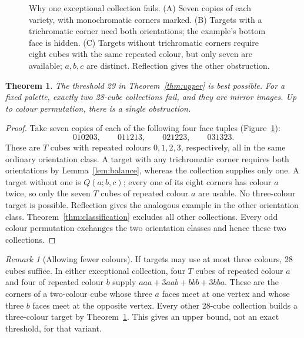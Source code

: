 \documentclass[11pt]{article}
\newtheorem{theorem}{Theorem}
\theoremstyle{remark}
\newtheorem*{remark}{Remark}
\begin{document}
\begin{figure}[ht]
\centering

\caption{Why one exceptional collection fails. (A) Seven copies of each
variety, with monochromatic corners marked. (B) Targets with a trichromatic
corner need both orientations; the example's bottom face is hidden. (C) Targets without
trichromatic corners require eight cubes with the same repeated colour,
but only seven are available; $a,b,c$ are distinct. Reflection gives the
other obstruction.}
\label{fig:obstruction}
\end{figure}
\begin{theorem}\label{thm:sharp}
The threshold 29 in Theorem~\ref{thm:upper} is best possible. For a fixed
palette, exactly two 28-cube collections fail, and they are mirror images.
Up to colour permutation, there is a single obstruction.
\end{theorem}
\begin{proof}
Take seven copies of each of the following four face tuples
(Figure~\ref{fig:obstruction}):
\[
 010203,\qquad 011213,\qquad 021223,\qquad 031323.
\]
These are $T$ cubes with repeated colours $0,1,2,3$, respectively, all in
the same ordinary orientation class. A target with any trichromatic corner
requires both orientations by Lemma~\ref{lem:balance}, whereas the
collection supplies only one. A target without one is $Q(a;b,c)$;
every one of its eight corners has colour $a$ twice, so only the seven
$T$ cubes of repeated colour $a$ are usable. No three-colour target is
possible. Reflection gives the analogous example in the other orientation
class. Theorem~\ref{thm:classification} excludes all other collections.
Every odd colour permutation exchanges the two orientation classes and
hence these two collections.
\end{proof}

\begin{remark}[Allowing fewer colours]
If targets may use at most three colours, 28 cubes suffice. In either
exceptional collection, four $T$ cubes of repeated colour $a$ and four of
repeated colour $b$ supply $aaa+3aab+bbb+3bba$. These are the corners of a
two-colour cube whose three $a$ faces meet at one vertex and whose three $b$
faces meet at the opposite vertex. Every other 28-cube collection builds
a three-colour target by Theorem~\ref{thm:sharp}. This gives an upper bound,
not an exact threshold, for that variant.
\end{remark}
\end{document}
